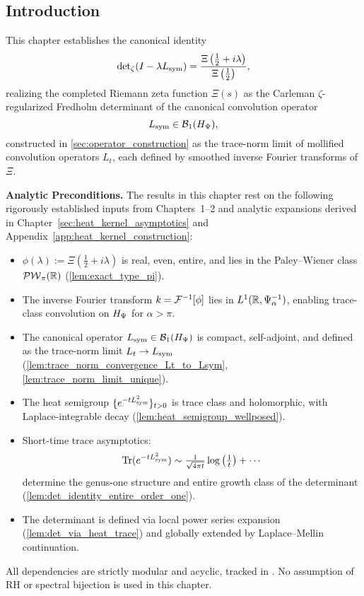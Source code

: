 \subsection*{Introduction}
\label{sec:det_intro}

This chapter establishes the canonical identity
\begin{equation}
\label{eq:zeta_det_identity}
\det\nolimits_{\zeta}(I - \lambda L_{\mathrm{sym}}) 
= \frac{\Xi\left( \tfrac{1}{2} + i\lambda \right)}{\Xi\left( \tfrac{1}{2} \right)},
\end{equation}
realizing the completed Riemann zeta function \( \Xi(s) \) as the Carleman \(\zeta\)-regularized Fredholm determinant of the canonical convolution operator
\[
L_{\mathrm{sym}} \in \mathcal{B}_1(H_{\Psi}),
\]
constructed in \cref{sec:operator_construction} as the trace-norm limit of mollified convolution operators \( L_t \), each defined by smoothed inverse Fourier transforms of \( \Xi \).

\begin{previewbox}
\textbf{Analytic Preconditions.} The results in this chapter rest on the following rigorously established inputs from Chapters~1–2 and analytic expansions derived in Chapter~\ref{sec:heat_kernel_asymptotics} and Appendix~\ref{app:heat_kernel_construction}:

\begin{itemize}
  \item \( \phi(\lambda) := \Xi(\tfrac{1}{2} + i\lambda) \) is real, even, entire, and lies in the Paley--Wiener class \( \mathcal{PW}_{\pi}(\mathbb{R}) \) (\cref{lem:exact_type_pi}).
  \item The inverse Fourier transform \( k = \mathcal{F}^{-1}[\phi] \) lies in \( L^1(\mathbb{R}, \Psi_\alpha^{-1}) \), enabling trace-class convolution on \( H_{\Psi} \) for \( \alpha > \pi \).
  \item The canonical operator \( L_{\mathrm{sym}} \in \mathcal{B}_1(H_{\Psi}) \) is compact, self-adjoint, and defined as the trace-norm limit \( L_t \to L_{\mathrm{sym}} \) (\cref{lem:trace_norm_convergence_Lt_to_Lsym}, \cref{lem:trace_norm_limit_unique}).
  \item The heat semigroup \( \{ e^{-t L_{\mathrm{sym}}^2} \}_{t > 0} \) is trace class and holomorphic, with Laplace-integrable decay (\cref{lem:heat_semigroup_wellposed}).
  \item Short-time trace asymptotics:
  \[
  \operatorname{Tr}(e^{-t L_{\mathrm{sym}}^2}) \sim \tfrac{1}{\sqrt{4\pi t}} \log\left(\tfrac{1}{t}\right) + \cdots
  \]
  determine the genus-one structure and entire growth class of the determinant (\cref{lem:det_identity_entire_order_one}).
  \item The determinant is defined via local power series expansion (\cref{lem:det_via_heat_trace}) and globally extended by Laplace--Mellin continuation.
\end{itemize}

All dependencies are strictly modular and acyclic, tracked in . No assumption of RH or spectral bijection is used in this chapter.
\end{previewbox}


